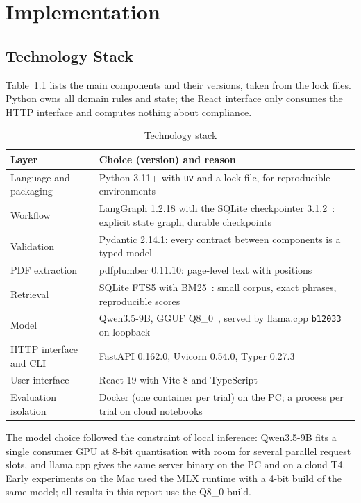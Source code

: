 \chapter{Implementation}

\section{Technology Stack}
Table~\ref{tab:stack} lists the main components and their versions, taken from the lock files.
Python owns all domain rules and state; the React interface only consumes the HTTP interface and
computes nothing about compliance.

\begin{table}[htbp]
\centering
\caption{Technology stack}
\label{tab:stack}
\small
\begin{tabularx}{\linewidth}{@{}l X@{}}
\toprule
\textbf{Layer} & \textbf{Choice (version) and reason} \\ \midrule
Language and packaging & Python 3.11+ with \texttt{uv} and a lock file, for reproducible environments \\
Workflow & LangGraph 1.2.18 with the SQLite checkpointer 3.1.2~\cite{langgraph}: explicit state graph, durable checkpoints \\
Validation & Pydantic 2.14.1: every contract between components is a typed model \\
PDF extraction & pdfplumber 0.11.10: page-level text with positions \\
Retrieval & SQLite FTS5 with BM25~\cite{fts5,robertson2009bm25}: small corpus, exact phrases, reproducible scores \\
Model & Qwen3.5-9B, GGUF Q8\_0~\cite{qwen35gguf}, served by llama.cpp \texttt{b12033}~\cite{llamacpp} on loopback \\
HTTP interface and CLI & FastAPI 0.162.0, Uvicorn 0.54.0, Typer 0.27.3 \\
User interface & React 19 with Vite 8 and TypeScript \\
Evaluation isolation & Docker (one container per trial) on the PC; a process per trial on cloud notebooks \\
\bottomrule
\end{tabularx}
\end{table}

The model choice followed the constraint of local inference: Qwen3.5-9B fits a single consumer GPU
at 8-bit quantisation with room for several parallel request slots, and llama.cpp gives the same
server binary on the PC and on a cloud T4. Early experiments on the Mac used the MLX runtime with a
4-bit build of the same model; all results in this report use the Q8\_0 build.

